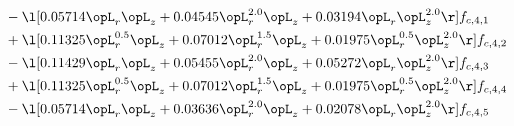 \begin{alignat}{2}
& - \l[  0.05714 \opL_r \opL_z +  0.04545 \opL_r^{2.0} \opL_z +  0.03194 \opL_r \opL_z^{2.0}  \r] f_{c,4,1} \nonumber \\ 
& + \l[  0.11325 \opL_r^{0.5} \opL_z +  0.07012 \opL_r^{1.5} \opL_z +  0.01975 \opL_r^{0.5} \opL_z^{2.0}  \r] f_{c,4,2} \nonumber \\ 
& - \l[  0.11429 \opL_r \opL_z +  0.05455 \opL_r^{2.0} \opL_z +  0.05272 \opL_r \opL_z^{2.0}  \r] f_{c,4,3} \nonumber \\ 
& + \l[  0.11325 \opL_r^{0.5} \opL_z +  0.07012 \opL_r^{1.5} \opL_z +  0.01975 \opL_r^{0.5} \opL_z^{2.0}  \r] f_{c,4,4} \nonumber \\ 
& - \l[  0.05714 \opL_r \opL_z +  0.03636 \opL_r^{2.0} \opL_z +  0.02078 \opL_r \opL_z^{2.0}  \r] f_{c,4,5} \nonumber \\ 
\end{alignat} 


